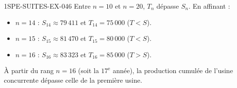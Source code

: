 \begin{corrige}{1SPE-SUITES-EX-046}
Entre $n = 10$ et $n = 20$, $T_n$ dépasse $S_n$. En affinant :

\begin{itemize}
  \item $n = 14$ : $S_{14} \approx 79\,411$ et $T_{14} = 75\,000$ ($T < S$).
  \item $n = 15$ : $S_{15} \approx 81\,470$ et $T_{15} = 80\,000$ ($T < S$).
  \item $n = 16$ : $S_{16} \approx 83\,323$ et $T_{16} = 85\,000$ ($T > S$). \checkmark
\end{itemize}

À partir du rang $n = 16$ (soit la $17^\text{e}$ année), la production cumulée de l'usine concurrente dépasse celle de la première usine.

\end{corrige}
